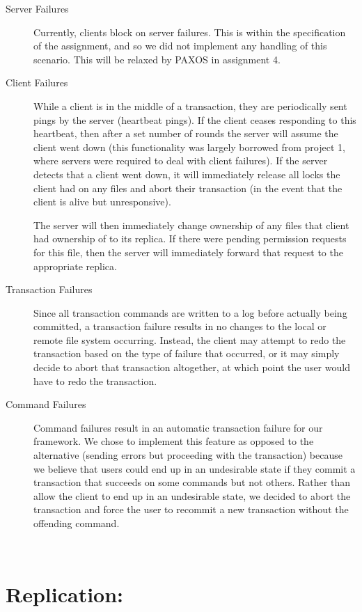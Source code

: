 \documentclass[11pt]{article}
\begin{document}
\begin{description}
\item[Server Failures] Currently, clients block on server failures. This is within the specification of the assignment, and so we did not implement any handling of this scenario. This will be relaxed by PAXOS in assignment 4.
\item[Client Failures] While a client is in the middle of a transaction, they are periodically sent pings by the server (heartbeat pings). If the client ceases responding to this heartbeat, then after a set number of rounds the server will assume the client went down (this functionality was largely borrowed from project 1, where servers were required to deal with client failures). If the server detects that a client went down, it will immediately release all locks the client had on any files and abort their transaction (in the event that the client is alive but unresponsive).

The server will then immediately change ownership of any files that client had ownership of to its replica. If there were pending permission requests for this file, then the server will immediately forward that request to the appropriate replica. 

\item[Transaction Failures] Since all transaction commands are written to a log before actually being committed, a transaction failure results in no changes to the local or remote file system occurring. Instead, the client
may attempt to redo the transaction based on the type of failure that occurred, or it may simply decide to abort that transaction altogether, at which point the user would have to redo the transaction. 
\item[Command Failures] Command failures result in an automatic transaction failure for our framework. We chose to implement this feature as opposed to the alternative (sending errors but proceeding with the transaction) because we believe that users could end up in an undesirable state if they commit a transaction that succeeds on some commands but not others. Rather than allow the client to end up in an undesirable state, we decided to abort the transaction and force the user to recommit a new transaction without the offending command.
\end{description}
\\

\section{Replication:} \\
\end{document}
